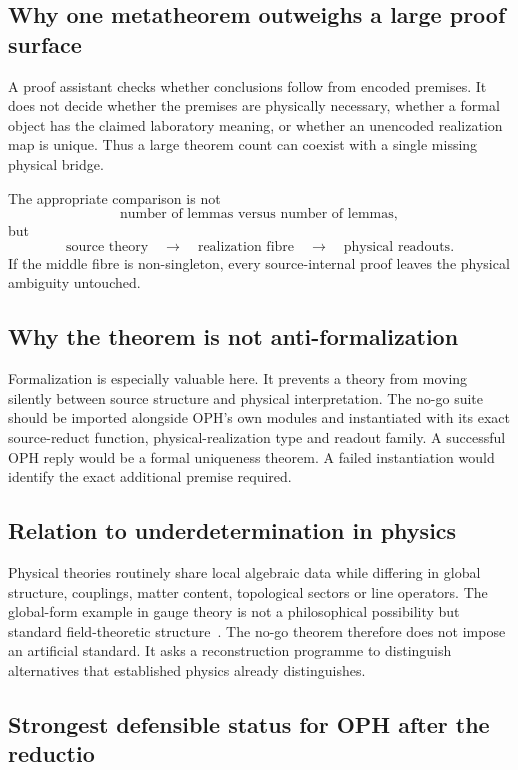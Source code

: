 \documentclass[10pt,a4paper]{article}
\theoremstyle{definition}
\theoremstyle{remark}
\begin{document}
\subsection{Why one metatheorem outweighs a large proof surface}

A proof assistant checks whether conclusions follow from encoded premises.  It
does not decide whether the premises are physically necessary, whether a
formal object has the claimed laboratory meaning, or whether an unencoded
realization map is unique.  Thus a large theorem count can coexist with a
single missing physical bridge.

The appropriate comparison is not
\[
\text{number of lemmas versus number of lemmas},
\]
but
\[
\text{source theory}\quad\longrightarrow\quad
\text{realization fibre}\quad\longrightarrow\quad
\text{physical readouts}.
\]
If the middle fibre is non-singleton, every source-internal proof leaves the
physical ambiguity untouched.

\subsection{Why the theorem is not anti-formalization}

Formalization is especially valuable here.  It prevents a theory from moving
silently between source structure and physical interpretation.  The no-go
suite should be imported alongside OPH's own modules and instantiated with
its exact source-reduct function, physical-realization type and readout family.
A successful OPH reply would be a formal uniqueness theorem.  A failed
instantiation would identify the exact additional premise required.

\subsection{Relation to underdetermination in physics}

Physical theories routinely share local algebraic data while differing in
global structure, couplings, matter content, topological sectors or line
operators.  The global-form example in gauge theory is not a philosophical
possibility but standard field-theoretic structure~\cite{AharonySeibergTachikawa}.
The no-go theorem therefore does not impose an artificial standard.  It asks a
reconstruction programme to distinguish alternatives that established physics
already distinguishes.

\subsection{Strongest defensible status for OPH after the reductio}
\end{document}

